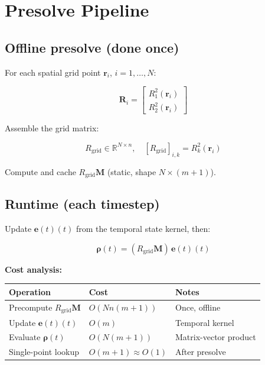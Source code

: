 \documentclass[11pt, a4paper, oneside]{article}
\newcommand{\Rit}[2]{R_{#1}^2(\mathbf{r}_{#2})}     %
\newcommand{\Rgrid}{R_{\mathrm{grid}}}
\newcommand{\Mmat}{\mathbf{M}}
\newcommand{\evec}{\mathbf{e}(t)}
\begin{document}
\section{Presolve Pipeline}
\label{sec:pipeline}

\subsection{Offline presolve (done once)}

For each spatial grid point $\mathbf{r}_i$, $i = 1, \ldots, N$:

\begin{equation}
  \mathbf{R}_i =
  \begin{bmatrix} \Rit{1}{i} \\ \Rit{2}{i} \end{bmatrix}
\end{equation}

Assemble the grid matrix:

\begin{equation}
  \Rgrid \in \mathbb{R}^{N \times n},
  \quad
  [\Rgrid]_{i,k} = R_k^2(\mathbf{r}_i)
\end{equation}

Compute and cache $\Rgrid \Mmat$ (static, shape $N \times (m+1)$).

\subsection{Runtime (each timestep)}

Update $\evec(t)$ from the temporal state kernel, then:

\begin{equation}
  \bm{\rho}(t) = (\Rgrid \Mmat)\,\evec(t)
  \label{eq:runtime_vec}
\end{equation}

\noindent\textbf{Cost analysis:}

\begin{center}
\begin{tabular}{lll}
  \toprule
  Operation & Cost & Notes \\
  \midrule
  Precompute $\Rgrid \Mmat$  & $O(N n (m+1))$ & Once, offline \\
  Update $\evec(t)$          & $O(m)$         & Temporal kernel \\
  Evaluate $\bm{\rho}(t)$    & $O(N(m+1))$    & Matrix-vector product \\
  Single-point lookup        & $O(m+1) \approx O(1)$ & After presolve \\
  \bottomrule
\end{tabular}
\end{center}
\end{document}
